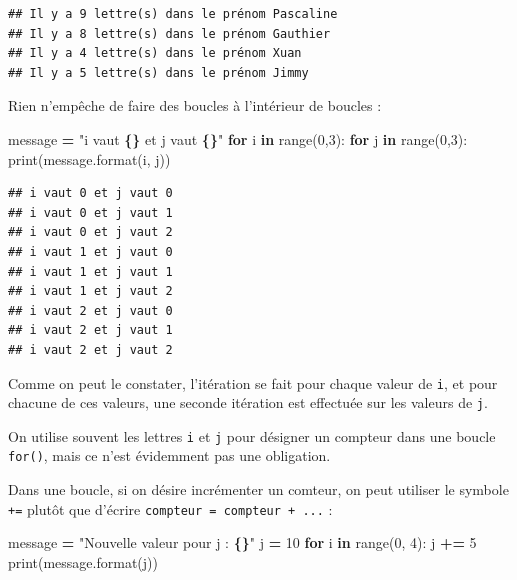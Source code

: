 \documentclass[
  12pt,
]{book}
\newenvironment{Shaded}{\begin{snugshade}}{\end{snugshade}}
\newcommand{\BuiltInTok}[1]{#1}
\newcommand{\ControlFlowTok}[1]{\textcolor[rgb]{0.13,0.29,0.53}{\textbf{#1}}}
\newcommand{\DecValTok}[1]{\textcolor[rgb]{0.00,0.00,0.81}{#1}}
\newcommand{\KeywordTok}[1]{\textcolor[rgb]{0.13,0.29,0.53}{\textbf{#1}}}
\newcommand{\NormalTok}[1]{#1}
\newcommand{\OperatorTok}[1]{\textcolor[rgb]{0.81,0.36,0.00}{\textbf{#1}}}
\newcommand{\SpecialCharTok}[1]{\textcolor[rgb]{0.81,0.36,0.00}{\textbf{#1}}}
\newcommand{\StringTok}[1]{\textcolor[rgb]{0.31,0.60,0.02}{#1}}
\numberwithin{equation}{section}
\newcounter{countremarque}
\newenvironment{remarque}{%
 \refstepcounter{countremarque}
    \begin{tcolorbox}[width=\linewidth, colback=blue!3, boxrule=0.5pt,arc=0pt,title = Remarque \thecountremarque]
    }%
    {
    \end{tcolorbox}
    }
\numberwithin{countremarque}{section}
\begin{document}
\begin{lstlisting}
## Il y a 9 lettre(s) dans le prénom Pascaline
## Il y a 8 lettre(s) dans le prénom Gauthier
## Il y a 4 lettre(s) dans le prénom Xuan
## Il y a 5 lettre(s) dans le prénom Jimmy
\end{lstlisting}

Rien n'empêche de faire des boucles à l'intérieur de boucles :

\begin{Shaded}
\begin{Highlighting}[]
\NormalTok{message }\OperatorTok{=} \StringTok{"i vaut }\SpecialCharTok{\{\}}\StringTok{ et j vaut }\SpecialCharTok{\{\}}\StringTok{"}
\ControlFlowTok{for}\NormalTok{ i }\KeywordTok{in} \BuiltInTok{range}\NormalTok{(}\DecValTok{0}\NormalTok{,}\DecValTok{3}\NormalTok{):}
    \ControlFlowTok{for}\NormalTok{ j }\KeywordTok{in} \BuiltInTok{range}\NormalTok{(}\DecValTok{0}\NormalTok{,}\DecValTok{3}\NormalTok{):}
        \BuiltInTok{print}\NormalTok{(message.}\BuiltInTok{format}\NormalTok{(i, j))}
\end{Highlighting}
\end{Shaded}

\begin{lstlisting}
## i vaut 0 et j vaut 0
## i vaut 0 et j vaut 1
## i vaut 0 et j vaut 2
## i vaut 1 et j vaut 0
## i vaut 1 et j vaut 1
## i vaut 1 et j vaut 2
## i vaut 2 et j vaut 0
## i vaut 2 et j vaut 1
## i vaut 2 et j vaut 2
\end{lstlisting}

Comme on peut le constater, l'itération se fait pour chaque valeur de \texttt{i}, et pour chacune de ces valeurs, une seconde itération est effectuée sur les valeurs de \texttt{j}.

\begin{remarque}
On utilise souvent les lettres \texttt{i} et \texttt{j} pour désigner un compteur dans une boucle \texttt{for()}, mais ce n'est évidemment pas une obligation.
\end{remarque}

Dans une boucle, si on désire incrémenter un comteur, on peut utiliser le symbole \texttt{+=} plutôt que d'écrire \texttt{compteur\ =\ compteur\ +\ ...} :

\begin{Shaded}
\begin{Highlighting}[]
\NormalTok{message }\OperatorTok{=} \StringTok{"Nouvelle valeur pour j : }\SpecialCharTok{\{\}}\StringTok{"}
\NormalTok{j }\OperatorTok{=} \DecValTok{10}
\ControlFlowTok{for}\NormalTok{ i }\KeywordTok{in} \BuiltInTok{range}\NormalTok{(}\DecValTok{0}\NormalTok{, }\DecValTok{4}\NormalTok{):}
\NormalTok{  j }\OperatorTok{+=} \DecValTok{5}
  \BuiltInTok{print}\NormalTok{(message.}\BuiltInTok{format}\NormalTok{(j))}
\end{Highlighting}
\end{Shaded}
\end{document}
